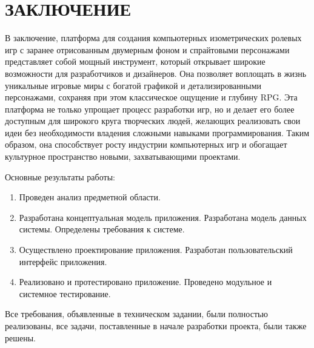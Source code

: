 \section*{ЗАКЛЮЧЕНИЕ}

В заключение, платформа для создания компьютерных изометрических ролевых игр с заранее отрисованным двумерным фоном и спрайтовыми персонажами представляет собой мощный инструмент, который открывает широкие возможности для разработчиков и дизайнеров. Она позволяет воплощать в жизнь уникальные игровые миры с богатой графикой и детализированными персонажами, сохраняя при этом классическое ощущение и глубину RPG. Эта платформа не только упрощает процесс разработки игр, но и делает его более доступным для широкого круга творческих людей, желающих реализовать свои идеи без необходимости владения сложными навыками программирования. Таким образом, она способствует росту индустрии компьютерных игр и обогащает культурное пространство новыми, захватывающими проектами.

Основные результаты работы:

\begin{enumerate}
\item Проведен анализ предметной области.
\item Разработана концептуальная модель приложения. Разработана модель данных системы. Определены требования к системе.
\item Осуществлено проектирование приложения. Разработан пользовательский интерфейс приложения.
\item Реализовано и протестировано приложение. Проведено модульное и системное тестирование.
\end{enumerate}

Все требования, объявленные в техническом задании, были полностью реализованы, все задачи, поставленные в начале разработки проекта, были также решены. 
